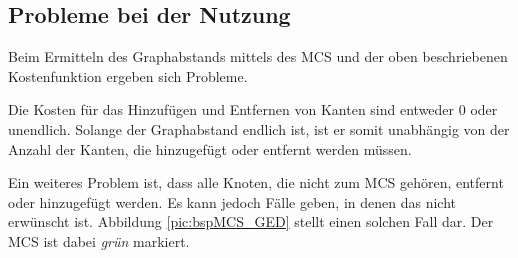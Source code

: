 \subsection{Probleme bei der Nutzung}
Beim Ermitteln des Graphabstands mittels des MCS und der oben beschriebenen 
Kostenfunktion ergeben sich Probleme.

Die Kosten für das Hinzufügen und Entfernen von Kanten sind entweder $0$ oder 
unendlich. Solange der Graphabstand endlich ist, ist er somit unabhängig von 
der Anzahl der Kanten, die hinzugefügt oder entfernt werden müssen.

Ein weiteres Problem ist, dass alle Knoten, die nicht zum MCS gehören, entfernt 
oder hinzugefügt werden. Es kann jedoch Fälle geben, in denen das nicht erwünscht 
ist. Abbildung \ref{pic:bspMCS_GED} stellt einen solchen Fall dar. Der MCS ist 
dabei \emph{grün} markiert.


